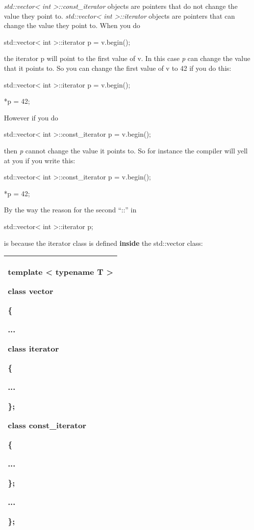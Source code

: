 \documentclass[
]{article}
\begin{document}
\emph{std::vector\textless{} int \textgreater::const\_iterator} objects
are pointers that do not change the value they point to.
\emph{std::vector\textless{} int \textgreater::iterator} objects are
pointers that can change the value they point to. When you do

std::vector\textless{} int \textgreater::iterator p = v.begin();

the iterator p will point to the first value of v. In this case \emph{p}
can change the value that it points to. So you can change the first
value of v to 42 if you do this:

std::vector\textless{} int \textgreater::iterator p = v.begin();

*p = 42;

However if you do

std::vector\textless{} int \textgreater::const\_iterator p = v.begin();

then \emph{p} cannot change the value it points to. So for instance the
compiler will yell at you if you write this:

std::vector\textless{} int \textgreater::const\_iterator p = v.begin();

*p = 42;

By the way the reason for the second ``::'' in

std::vector\textless{} int \textgreater::iterator p;

is because the iterator class is defined \textbf{inside} the std::vector
class:

\begin{longtable}[]{@{}l@{}}
\toprule
\endhead
\begin{minipage}[t]{0.97\columnwidth}\raggedright
template \textless{} typename T \textgreater{}

class vector

\{

...

class iterator

\{

...

\};

class const\_iterator

\{

...

\};

...

\};\strut
\end{minipage}\tabularnewline
\bottomrule
\end{longtable}
\end{document}

